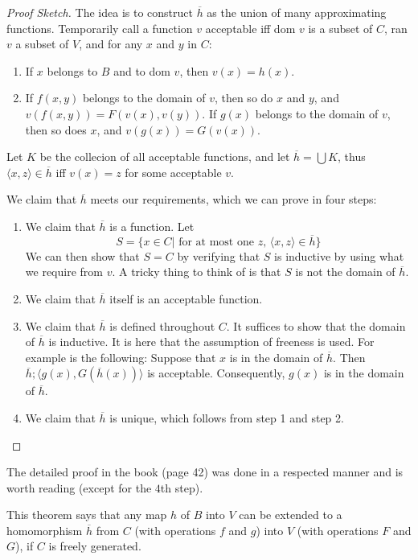 \begin{proof}[Proof Sketch]
  The idea is to construct $\overline{h}$ as the union of many approximating functions. Temporarily call a function $v$ acceptable iff dom $v$ is a subset of $C$, ran $v$ a subset of $V$, and for any $x$ and $y$ in $C$:
  \begin{enumerate}
    \item If $x$ belongs to $B$ and to dom $v$, then $v(x)=h(x)$.
    \item If $f(x,y)$ belongs to the domain of $v$, then so do $x$ and $y$, and $v(f(x,y))=F(v(x),v(y))$. If $g(x)$ belongs to the domain of $v$, then so does $x$, and $v(g(x))=G(v(x))$.
  \end{enumerate}
  Let $K$ be the collecion of all acceptable functions, and let $\overline{h}=\bigcup K$, thus $\langle x,z\rangle\in\overline{h}$ iff $v(x)=z$ for some acceptable $v$.

  We claim that $\overline{h}$ meets our requirements, which we can prove in four steps:
  \begin{enumerate}
    \item We claim that $\overline{h}$ is a function. Let
          \[
            S=\{x\in C|\text{ for at most one $z$, }\langle x,z\rangle\in \overline{h}\}
          \]
          We can then show that $S=C$ by verifying that $S$ is inductive by using what we require from $v$. A tricky thing to think of is that $S$ is not the domain of $\overline{h}$.
    \item We claim that $\overline{h}$ itself is an acceptable function.
    \item We claim that $\overline{h}$ is defined throughout $C$. It suffices to show that the domain of $\overline{h}$ is inductive. It is here that the assumption of freeness is used. For example is the following: Suppose that $x$ is in the domain of $\overline{h}$. Then $\overline{h};\langle g(x),G(\overline{h}(x))\rangle$ is acceptable. Consequently, $g(x)$ is in the domain of $\overline{h}$.
    \item We claim that $\overline{h}$ is unique, which follows from step 1 and step 2.\qedhere
  \end{enumerate}
\end{proof}
The detailed proof in the book (page 42) was done in a respected manner and is worth reading (except for the $4$th step).

This theorem says that any map $h$ of $B$ into $V$ can be extended to a homomorphism $\overline{h}$ from $C$ (with operations $f$ and $g$) into $V$ (with operations $F$ and $G$), if $C$ is freely generated.

